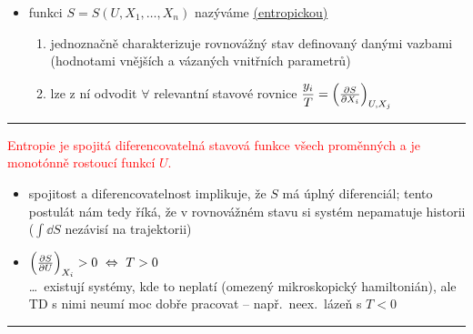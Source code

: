 \begin{itemize}
  \item[$\to$] funkci $S = S(U,X_1,\dots,X_n)$ nazýváme \underline{(entropickou) }
  \begin{enumerate}[label=\arabic*)]
    \item jednoznačně charakterizuje rovnovážný stav definovaný danými vazbami \textcolor{NavyBlue}{(hodnotami vnějších a vázaných vnitřních parametrů)}
    \item lze z ní odvodit $\forall$ relevantní stavové rovnice \quad \textcolor{NavyBlue}{$\dfrac{y_i}{T} = \Big(\pdv{S}{X_i}\Big)_{U,X_j}$}
  \end{enumerate}
\end{itemize}
\noindent\rule{\linewidth}{0.4pt}
\begin{veta}[Postulát 3]
\textcolor{Red}{Entropie je spojitá diferencovatelná stavová funkce všech proměnných a je monotónně rostoucí funkcí $U$.}
\end{veta}
\begin{itemize}
  \item[$\to$] spojitost a diferencovatelnost implikuje, že $S$ má úplný diferenciál; tento postulát nám tedy říká, že v rovnovážném stavu si systém nepamatuje historii ($\int\dd S$ nezávisí na trajektorii)
  \item[$\to$] $\Big(\pdv{S}{U}\Big)_{X_i} > 0 \ \Leftrightarrow\ T > 0$ \\
  \dots\ existují systémy, kde to neplatí (omezený mikroskopický hamiltonián), ale TD s nimi neumí moc dobře pracovat -- např.\ neex.\ lázeň s $T < 0$
\end{itemize}
\noindent\rule{\linewidth}{0.4pt}

